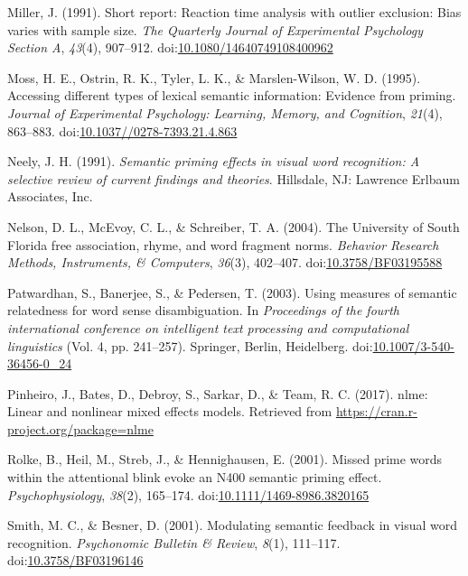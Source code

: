\documentclass[english,man]{apa6}
\theoremstyle{definition}
\theoremstyle{definition}
\theoremstyle{definition}
\theoremstyle{remark}
\begin{document}
\hypertarget{ref-Miller1991}{}
Miller, J. (1991). Short report: Reaction time analysis with outlier
exclusion: Bias varies with sample size. \emph{The Quarterly Journal of
Experimental Psychology Section A}, \emph{43}(4), 907--912.
doi:\href{https://doi.org/10.1080/14640749108400962}{10.1080/14640749108400962}

\hypertarget{ref-Moss1995}{}
Moss, H. E., Ostrin, R. K., Tyler, L. K., \& Marslen-Wilson, W. D.
(1995). Accessing different types of lexical semantic information:
Evidence from priming. \emph{Journal of Experimental Psychology:
Learning, Memory, and Cognition}, \emph{21}(4), 863--883.
doi:\href{https://doi.org/10.1037//0278-7393.21.4.863}{10.1037//0278-7393.21.4.863}

\hypertarget{ref-Neely1991}{}
Neely, J. H. (1991). \emph{Semantic priming effects in visual word
recognition: A selective review of current findings and theories}.
Hillsdale, NJ: Lawrence Erlbaum Associates, Inc.

\hypertarget{ref-Nelson2004}{}
Nelson, D. L., McEvoy, C. L., \& Schreiber, T. A. (2004). The University
of South Florida free association, rhyme, and word fragment norms.
\emph{Behavior Research Methods, Instruments, \& Computers},
\emph{36}(3), 402--407.
doi:\href{https://doi.org/10.3758/BF03195588}{10.3758/BF03195588}

\hypertarget{ref-Patwardhan2003}{}
Patwardhan, S., Banerjee, S., \& Pedersen, T. (2003). Using measures of
semantic relatedness for word sense disambiguation. In \emph{Proceedings
of the fourth international conference on intelligent text processing
and computational linguistics} (Vol. 4, pp. 241--257). Springer, Berlin,
Heidelberg.
doi:\href{https://doi.org/10.1007/3-540-36456-0_24}{10.1007/3-540-36456-0\_24}

\hypertarget{ref-Pinheiro2017}{}
Pinheiro, J., Bates, D., Debroy, S., Sarkar, D., \& Team, R. C. (2017).
nlme: Linear and nonlinear mixed effects models. Retrieved from
\url{https://cran.r-project.org/package=nlme}

\hypertarget{ref-Rolke2001}{}
Rolke, B., Heil, M., Streb, J., \& Hennighausen, E. (2001). Missed prime
words within the attentional blink evoke an N400 semantic priming
effect. \emph{Psychophysiology}, \emph{38}(2), 165--174.
doi:\href{https://doi.org/10.1111/1469-8986.3820165}{10.1111/1469-8986.3820165}

\hypertarget{ref-Smith2001}{}
Smith, M. C., \& Besner, D. (2001). Modulating semantic feedback in
visual word recognition. \emph{Psychonomic Bulletin \& Review},
\emph{8}(1), 111--117.
doi:\href{https://doi.org/10.3758/BF03196146}{10.3758/BF03196146}
\end{document}
